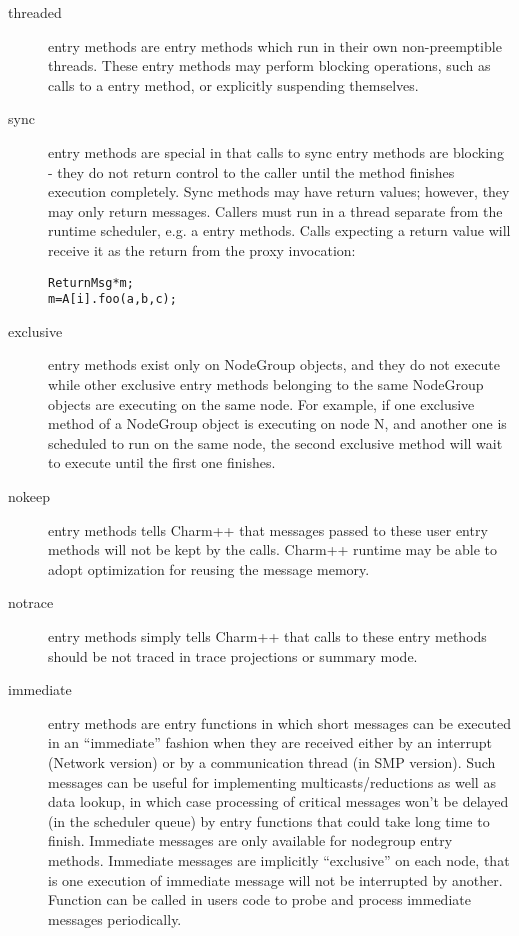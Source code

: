 \begin{description}
\item[threaded] entry methods are
entry methods which run in their own non-preemptible threads. These
entry methods may perform blocking operations, such as calls to a
 entry method, or explicitly suspending themselves.

\item[sync] entry methods are special in that
calls to sync entry methods are blocking - they do not return control to the
caller until the method finishes execution completely. Sync methods may
have return values; however, they may only return messages. Callers must run in
a thread separate from the runtime scheduler, e.g. a  entry
methods.  Calls expecting a return value will receive it as the return from the
proxy invocation:
\begin{alltt}
ReturnMsg* m;
m = A[i].foo(a, b, c);
\end{alltt}

\item[exclusive] entry methods exist only on NodeGroup
objects, and they do not execute while other exclusive entry methods belonging to the same NodeGroup objects are executing on
the same node.  For example, if one exclusive method of a NodeGroup object is
executing on node N, and another one is scheduled to run on the same node, the
second exclusive method will wait to execute until the first one finishes.

\item[nokeep] entry methods tells Charm++ that messages passed to
these user entry methods will not be kept by the calls. Charm++ runtime
may be able to adopt optimization for reusing the message memory.

\item[notrace] entry methods simply tells Charm++ that calls to 
these entry methods should be not traced in trace projections or summary mode.

\item[immediate] entry methods are entry functions in which 
short messages can be executed in an ``immediate'' fashion when they are
received either by an interrupt (Network version) or by a communication thread
(in SMP version). Such messages can be useful for implementing
multicasts/reductions as well as data lookup, in which case processing of
critical messages won't be delayed (in the scheduler queue) by entry functions
that could take long time to finish. Immediate messages are only available for
nodegroup entry methods. Immediate messages are implicitly ``exclusive'' on each
node, that is one execution of immediate message will not be interrupted by
another. Function  can be called in users code to
probe and process immediate messages periodically.


\end{description}
